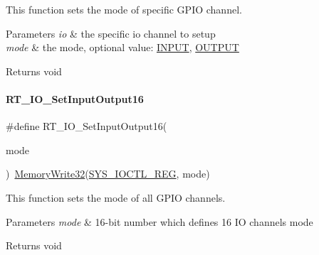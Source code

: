 This function sets the mode of specific G\+P\+IO channel. 


\begin{DoxyParams}{Parameters}
{\em io} & the specific io channel to setup \\
\hline
{\em mode} & the mode, optional value\+: \mbox{\hyperlink{a00014_a1bb283bd7893b9855e2f23013891fc82}{I\+N\+P\+UT}}, \mbox{\hyperlink{a00014_a61a3c9a18380aafb6e430e79bf596557}{O\+U\+T\+P\+UT}} \\
\hline
\end{DoxyParams}
\begin{DoxyReturn}{Returns}
void 
\end{DoxyReturn}
\mbox{\label{a00014_ade4bc867a36445fe0debc59cd5c9d9a5}} 
\paragraph{\texorpdfstring{R\+T\+\_\+\+I\+O\+\_\+\+Set\+Input\+Output16}{RT\_IO\_SetInputOutput16}}
{\footnotesize\ttfamily \#define R\+T\+\_\+\+I\+O\+\_\+\+Set\+Input\+Output16(\begin{DoxyParamCaption}\item[{}]{mode }\end{DoxyParamCaption})~\mbox{\hyperlink{a00020_ad9953f631a539cfaa35baf94f878b3ec}{Memory\+Write32}}(\mbox{\hyperlink{a00020_adadaa0ab1ebbd7ba9b70dfd24c3ed44da835280d31e2f3f5bc44bb1eb58024d80}{S\+Y\+S\+\_\+\+I\+O\+C\+T\+L\+\_\+\+R\+EG}}, mode)}



This function sets the mode of all G\+P\+IO channels. 


\begin{DoxyParams}{Parameters}
{\em mode} & 16-\/bit number which defines 16 IO channels\textquotesingle{} mode \\
\hline
\end{DoxyParams}
\begin{DoxyReturn}{Returns}
void 
\end{DoxyReturn}
\mbox{\label{a00014_a95fe40498ba314e1ea68aaa50335e7ef}} 
